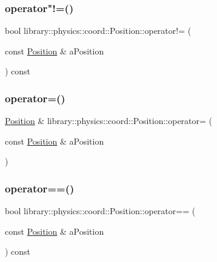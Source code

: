 \subsubsection{\texorpdfstring{operator"!=()}{operator!=()}}
{\footnotesize\ttfamily bool library\+::physics\+::coord\+::\+Position\+::operator!= (\begin{DoxyParamCaption}\item[{const \hyperlink{classlibrary_1_1physics_1_1coord_1_1_position}{Position} \&}]{a\+Position }\end{DoxyParamCaption}) const}

\mbox{\label{classlibrary_1_1physics_1_1coord_1_1_position_af09db5e8cedf8a643ad8fc7632a8826f}} 
\subsubsection{\texorpdfstring{operator=()}{operator=()}}
{\footnotesize\ttfamily \hyperlink{classlibrary_1_1physics_1_1coord_1_1_position}{Position} \& library\+::physics\+::coord\+::\+Position\+::operator= (\begin{DoxyParamCaption}\item[{const \hyperlink{classlibrary_1_1physics_1_1coord_1_1_position}{Position} \&}]{a\+Position }\end{DoxyParamCaption})}

\mbox{\label{classlibrary_1_1physics_1_1coord_1_1_position_a520bfdf64e8f45f60e815ebc72012fde}} 
\subsubsection{\texorpdfstring{operator==()}{operator==()}}
{\footnotesize\ttfamily bool library\+::physics\+::coord\+::\+Position\+::operator== (\begin{DoxyParamCaption}\item[{const \hyperlink{classlibrary_1_1physics_1_1coord_1_1_position}{Position} \&}]{a\+Position }\end{DoxyParamCaption}) const}

